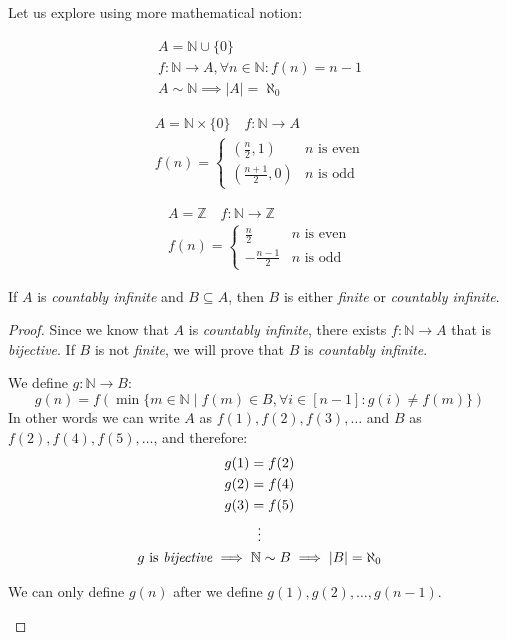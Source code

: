 \documentclass[00_complete]{subfiles}
\begin{document}
Let us explore using more mathematical notion:
\begin{example}
    \begin{gather*}
    A=\mathbb{N}\cup \{0\} \\
    f:\mathbb{N}\to A, \forall n \in \mathbb{N}: f(n)=n-1 \\
    A \sim \mathbb{N} \implies |A|=\aleph_0
    \end{gather*}
\end{example}
\begin{example}
    \begin{gather*}
        A=\mathbb{N}\times\{0\} \quad f:\mathbb{N} \to A\\
        f(n) = \begin{cases}
            (\frac{n}{2},1) & \text{$n$ is even} \\
            (\frac{n+1}{2},0) & \text{$n$ is odd}
        \end{cases}
    \end{gather*}
\end{example}
\begin{example}
    \begin{gather*}
        A=\mathbb{Z} \quad f:\mathbb{N}\to\mathbb{Z} \\
        f(n) = \begin{cases}
            \frac{n}{2} & \text{$n$ is even} \\
            -\frac{n-1}{2} & \text{$n$ is odd}
        \end{cases}
    \end{gather*}
\end{example}
\begin{claim}
    If $A$ is \emph{countably infinite} and $B \subseteq A$, then $B$
    is either \emph{finite} or \emph{countably infinite}.
\end{claim}
\begin{proof}
    Since we know that $A$ is \emph{countably infinite}, there exists
    $f:\mathbb{N}\to A$ that is \emph{bijective}. If $B$ is not \emph{finite},
    we will prove that $B$ is \emph{countably infinite}.

    We define $g:\mathbb{N}\to B$:
    $$g(n)=f(\min\{m\in\mathbb{N} \mid f(m) \in B, \forall i\in [n-1]: g(i)\neq
    f(m)\})$$
    In other words we can write $A$ as $f(1),f(2),f(3),\dots$ and $B$ as
    $f(2),f(4),f(5),\dots$, and therefore:
    \begin{gather*}
        g(1)=f(2) \\ g(2)=f(4) \\ g(3)=f(5) \\ \vdots \\
        g \text{ is \emph{bijective}} \implies \mathbb{N} \sim B \implies
        |B|=\aleph_0
    \end{gather*}
\begin{note}
    We can only define $g(n)$ after we define $g(1),g(2),\dots,g(n-1)$.
\end{note}
\end{proof}
\end{document}
